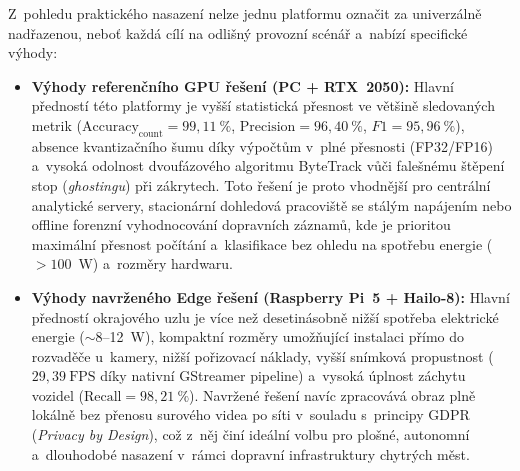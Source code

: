 Z~pohledu praktického nasazení nelze jednu platformu označit za univerzálně nadřazenou, neboť každá cílí na odlišný provozní scénář a~nabízí specifické výhody:
\begin{itemize}
    \item \textbf{Výhody referenčního GPU řešení (PC + RTX~2050):} Hlavní předností této platformy je vyšší statistická přesnost ve většině sledovaných metrik ($\text{Accuracy}_{\text{count}} = 99{,}11~\%$, $\text{Precision} = 96{,}40~\%$, $F1 = 95{,}96~\%$), absence kvantizačního šumu díky výpočtům v~plné přesnosti (FP32/FP16) a~vysoká odolnost dvoufázového algoritmu ByteTrack vůči falešnému štěpení stop (\textit{ghostingu}) při zákrytech. Toto řešení je proto vhodnější pro centrální analytické servery, stacionární dohledová pracoviště se stálým napájením nebo offline forenzní vyhodnocování dopravních záznamů, kde je prioritou maximální přesnost počítání a~klasifikace bez ohledu na spotřebu energie ($> 100$~W) a~rozměry hardwaru.
    \item \textbf{Výhody navrženého Edge řešení (Raspberry Pi~5 + Hailo-8):} Hlavní předností okrajového uzlu je více než desetinásobně nižší spotřeba elektrické energie ($\sim$8--12~W), kompaktní rozměry umožňující instalaci přímo do rozvaděče u~kamery, nižší pořizovací náklady, vyšší snímková propustnost ($29{,}39~\text{FPS}$ díky nativní GStreamer pipeline) a~vysoká úplnost záchytu vozidel ($\text{Recall} = 98{,}21~\%$). Navržené řešení navíc zpracovává obraz plně lokálně bez přenosu surového videa po síti v~souladu s~principy \acs{GDPR} (\textit{Privacy by Design}), což z~něj činí ideální volbu pro plošné, autonomní a~dlouhodobé nasazení v~rámci dopravní infrastruktury chytrých měst.
\end{itemize}